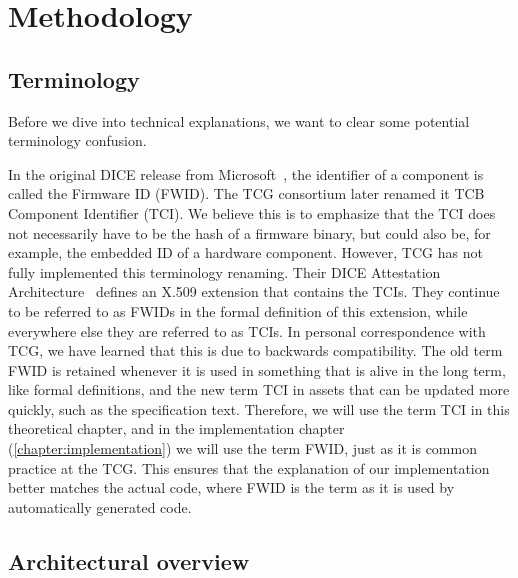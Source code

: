 
\chapter{Methodology}\label{chapter:methodology}

\section{Terminology}\label{sec:terminology}

Before we dive into technical explanations, we want to clear some potential terminology confusion.

In the original DICE release from Microsoft~\cite{England2016}, the identifier of a component is called the Firmware ID (FWID).
The TCG consortium later renamed it TCB Component Identifier (TCI).
We believe this is to emphasize that the TCI does not necessarily have to be the hash of a firmware binary, but could also be, for example, the embedded ID of a hardware component.
However, TCG has not fully implemented this terminology renaming.
Their DICE Attestation Architecture~\cite{TCGAttestation2021} defines an X.509 extension that contains the TCIs.
They continue to be referred to as FWIDs in the formal definition of this extension, while everywhere else they are referred to as TCIs.
In personal correspondence with TCG, we have learned that this is due to backwards compatibility.
The old term FWID is retained whenever it is used in something that is alive in the long term, like formal definitions, and the new term TCI in assets that can be updated more quickly, such as the specification text.
Therefore, we will use the term TCI in this theoretical chapter, and in the implementation chapter (\autoref{chapter:implementation}) we will use the term FWID, just as it is common practice at the TCG\@.
This ensures that the explanation of our implementation better matches the actual code, where FWID is the term as it is used by automatically generated code.



\section{Architectural overview}



